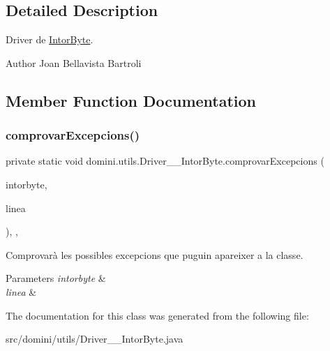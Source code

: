 \subsection{Detailed Description}
Driver de \hyperlink{classdomini_1_1utils_1_1IntorByte}{Intor\+Byte}. 

\begin{DoxyAuthor}{Author}
Joan Bellavista Bartroli 
\end{DoxyAuthor}


\subsection{Member Function Documentation}
\mbox{\label{classdomini_1_1utils_1_1Driver____IntorByte_a3cb28e1e1b318e0b8e4809ebd171c8b2}} 
\subsubsection{\texorpdfstring{comprovar\+Excepcions()}{comprovarExcepcions()}}
{\footnotesize\ttfamily private static void domini.\+utils.\+Driver\+\_\+\+\_\+\+Intor\+Byte.\+comprovar\+Excepcions (\begin{DoxyParamCaption}\item[{\hyperlink{classdomini_1_1utils_1_1IntorByte}{Intor\+Byte}}]{intorbyte,  }\item[{String}]{linea }\end{DoxyParamCaption})\hspace{0.3cm}{\ttfamily [inline]}, {\ttfamily [static]}, {\ttfamily [private]}}



Comprovarà les possibles excepcions que puguin apareixer a la classe. 


\begin{DoxyParams}{Parameters}
{\em intorbyte} & \\
\hline
{\em linea} & \\
\hline
\end{DoxyParams}


The documentation for this class was generated from the following file\+:\begin{DoxyCompactItemize}
\item 
src/domini/utils/Driver\+\_\+\+\_\+\+Intor\+Byte.\+java\end{DoxyCompactItemize}
